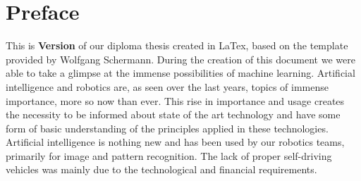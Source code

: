 \chapter{Preface}


This is \textbf{Version \htldiplDate} of our diploma thesis created in LaTex, based on the template provided by Wolfgang Schermann.
During the creation of this document we were able to take a glimpse at the immense possibilities of machine learning. Artificial intelligence and robotics are, as seen over the last years, topics of immense importance, more so now than ever. This rise in importance and usage creates the necessity to be informed about state of the art technology and have some form of basic understanding of the principles applied in these technologies. Artificial intelligence is nothing new and has been used by our robotics teams, primarily for image and pattern recognition. The lack of proper self-driving vehicles was mainly due to the technological and financial requirements. 
